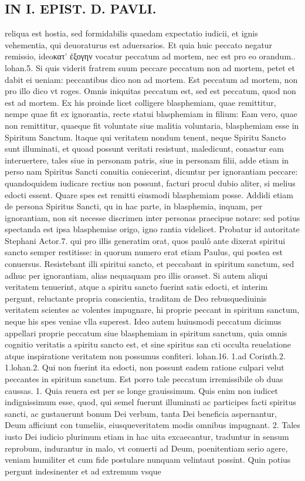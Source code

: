 \documentclass{article}
\begin{document}
\begin{pages}
\section*{IN I. EPIST. D. PAVLI. }
\marginpar{[ p.39 ]}\pstart   reliqua est hostia, sed formidabilis quaedam expectatio iudicii, et ignis vehementia, qui   deuoraturus est aduersarios. Et quia huic peccato negatur remissio, ideoκατ' ἐξογην vocatur peccatum ad mortem, nec est pro eo orandum.. lohan.5. Si quis viderit fratrem suum peccare peccatum non ad mortem, petet et dabit ei ueniam: peccantibus dico non ad mortem. Est peccatum ad mortem, non pro illo dico vt roges. Omnis iniquitas peccatum est, sed est peccatum, quod non est ad mortem. Ex his proinde licet colligere blasphemiam, quae remittitur, nempe quae fit ex ignorantia, recte statui blasphemiam in filium: Eam vero, quae non remittitur, quaeque  fit voluntate siue malitia voluntaria, blasphemiam esse in Spiritum Sanctum. ltaque  qui veritatem nondum tenent, neque  Spiritu Sancto sunt illuminati, et quoad possunt veritati resistunt, maledicunt, conastur eam interuertere, tales siue in personam patris, siue in personam filii, adde etiam in perso nam Spiritus Sancti conuitia coniecerint, dicuntur per ignorantiam peccare: quandoquidem iudicare rectius non possunt, facturi procul dubio aliter, si melius edocti essent. Quare spes est remitti eiusmodi blasphemiam posse. Addidi etiam de persona Spiritus Sancti, qu in hac parte, in blasphemia, inquam, per ignorantiam, non sit necesse discrimen inter personas praecipue notare: sed potius spectanda est ipsa blasphemiae origo, igno rantia videlicet. Probatur id autoritate Stephani Actor.7. qui pro illis generatim orat, quos paulô ante dixerat spiritui sancto semper restitisse: in quorum numero erat etiam Paulus, qui postea est conuersus. Resistebant illi spiritui sancto, et peccabant in spiritum sanctum, sed adhuc per ignorantiam, alias nequaquam pro illis orasset. Si autem aliqui veritatem tenuerint, atque  a spiritu sancto fuerint satis edocti, et interim pergunt, reluctante propria conscientia, traditam de Deo rebusquediuinis veritatem scientes ac volentes impugnare, hi proprie peccant in spiritum sanctum, neque  his spes veniae vlla superest. Ideo autem huiusmodi peccatum dicimus appellari proprie peccatum siue blasphemiam in spiritum sanctum, quia omnis cognitio veritatis a spiritu sancto est, et sine spiritus san cti occulta reuelatione atque  inspiratione veritatem non possumus confiteri. lohan.16. 1.ad Corinth.2. 1.lohan.2. Qui non fuerint ita edocti, non possunt eadem ratione culpari velut peccantes in spiritum sanctum. Est porro tale peccatum irremissibile ob duas caussas. 1. Quia reuera est per se longe grauissimum. Quis enim non iudicet indignissimum esse, quod, qui semel fuerunt illuminati ac participes facti spiritus sancti, ac gustauerunt bonum Dei verbum, tanta Dei beneficia aspernantur, Deum afficiunt con tumeliis, eiusqueveritatem modis omnibus impugnant. 2. Tales iusto Dei iudicio plurimum etiam in hac uita excaecantur, traduntur in sensum reprobum, indurantur in malo, vt conuerti ad Deum, poenitentiam serio agere, veniam humiliter et cum fide postulare nunquam velintaut possint. Quin potius pergunt indesinenter et ad extremum vsque  
\end{pages}
\end{document}
